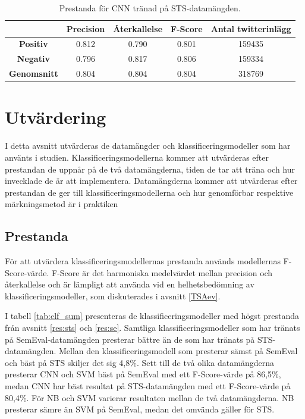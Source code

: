 \documentclass{kaumasters} %
\begin{document}
\begin{table}[H]
\centering
\caption{Prestanda för CNN tränad på STS-datamängden.}
\label{tab:cnn_sts}
    \begin{tabular}{ccccc}
    \toprule
     & \textbf{Precision} & \textbf{Återkallelse} & \textbf{F-Score} & \textbf{Antal twitterinlägg}  \\
    \midrule
    \textbf{Positiv} & 0.812 & 0.790 & 0.801 & 159435 \\
    \textbf{Negativ} & 0.796 & 0.817 & 0.806 & 159334 \\
    \midrule
    \textbf{Genomsnitt} & 0.804 & 0.804 & 0.804  & 318769 \\
    \bottomrule
\end{tabular}
\end{table}

\section{Utvärdering}\label{res:utv}
I detta avsnitt utvärderas de datamängder och klassificeringsmodeller som har använts i studien. Klassificeringsmodellerna kommer att utvärderas efter prestandan de uppnår på de två datamängderna, tiden de tar att träna och hur invecklade de är att implementera. Datamängderna kommer att utvärderas efter prestandan de ger till klassificeringsmodellerna och hur genomförbar respektive märkningsmetod är i praktiken

\subsection{Prestanda}\label{res:pres}
För att utvärdera klassificeringsmodellernas prestanda används modellernas F-Score-värde. F-Score är det harmoniska medelvärdet mellan precision och återkallelse och är lämpligt att använda vid en helhetsbedömning av klassificeringsmodeller, som diskuterades i avsnitt \ref{TSAev}. 

I tabell \ref{tab:clf_sum} presenteras de klassificeringsmodeller med högst prestanda från avsnitt \ref{res:sts} och \ref{res:se}. Samtliga klassificeringsmodeller som har tränats på SemEval-datamängden presterar bättre än de som har tränats på STS-datamängden. Mellan den klassificeringsmodell som presterar sämst på SemEval och bäst på STS skiljer det sig 4,8\%. Sett till de två olika datamängderna presterar CNN och SVM bäst på SemEval med ett F-Score-värde på 86,5\%, medan CNN har bäst resultat på STS-datamängden med ett F-Score-värde på 80,4\%. För NB och SVM varierar resultaten mellan de två datamängderna. NB presterar sämre än SVM på SemEval, medan det omvända gäller för STS.
\end{document}
